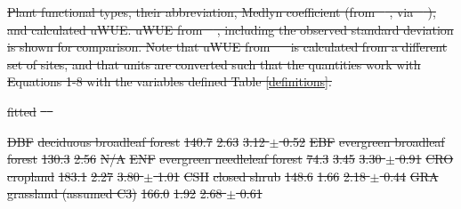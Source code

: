 \documentclass[draft,linenumbers]{agujournal}
\providecommand{\DIFdel}[1]{{\protect\color{red}\sout{#1}}}                      %
\providecommand{\DIFdelbegin}{} %
\providecommand{\DIFdelFL}[1]{\DIFdel{#1}} %
\begin{document}
\DIFdelbegin %
{%
\DIFdelFL{Plant functional types, their abbreviation, Medlyn
coefficient (from \mbox{%
\citet{Lin_2015}}%
, via \mbox{%
\citet{Franks_2017}}%
), and
calculated uWUE. uWUE from \mbox{%
\citet{Zhou_2015}}%
, including the observed
standard deviation is shown for comparison. Note that uWUE from
\mbox{%
\citet{Zhou_2015} }%
is calculated from a different set of sites, and
that units are converted such that the quantities work with Equations
1-8 with the variables defined Table \ref{definitions}.}}  %
\centering

\DIFdelFL{fitted }%
\DIFdelFL{\mbox{%
\citet{Zhou_2015} }%
}%

\DIFdelFL{DBF }%
\DIFdelFL{deciduous broadleaf forest }%
\DIFdelFL{140.7 }%
\DIFdelFL{2.63 }%
\DIFdelFL{3.12 $\pm$
0.52 }%
\DIFdelFL{EBF }%
\DIFdelFL{evergreen broadleaf forest }%
\DIFdelFL{130.3 }%
\DIFdelFL{2.56 }%
\DIFdelFL{N/A }%
\DIFdelFL{ENF }%
\DIFdelFL{evergreen needleleaf forest }%
\DIFdelFL{74.3 }%
\DIFdelFL{3.45 }%
\DIFdelFL{3.30 $\pm$ 0.91 }%
\DIFdelFL{CRO }%
\DIFdelFL{cropland }%
\DIFdelFL{183.1 }%
\DIFdelFL{2.27 }%
\DIFdelFL{3.80 $\pm$ 1.01 }%
\DIFdelFL{CSH }%
\DIFdelFL{closed shrub }%
\DIFdelFL{148.6 }%
\DIFdelFL{1.66 }%
\DIFdelFL{2.18 $\pm$ 0.44 }%
\DIFdelFL{GRA }%
\DIFdelFL{grassland (assumed C3)}%
\DIFdelFL{166.0
}%
\DIFdelFL{1.92 }%
\DIFdelFL{2.68 $\pm$ 0.61 }%
\end{document}
